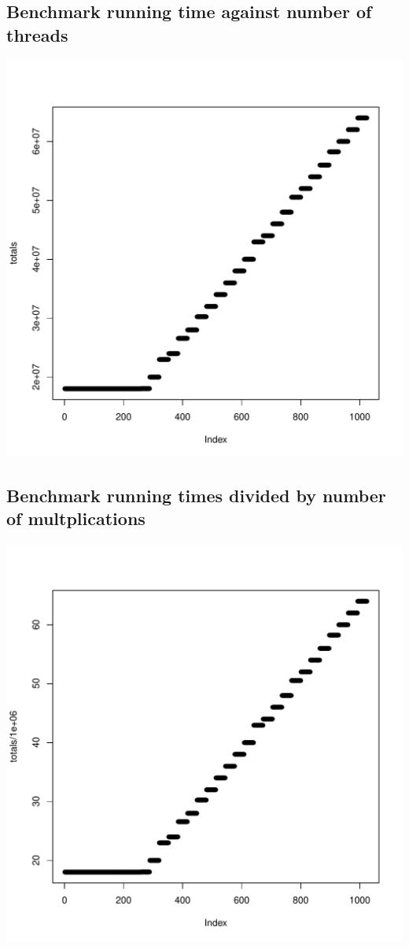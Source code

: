 \documentclass{article}
\begin{document}
	\subsection{Benchmark running time against number of threads}
	\includegraphics[width=\linewidth]{"graphics/running_times"}
	\pagebreak

	\subsection{Benchmark running times divided by number of multplications}
	\includegraphics[width=\linewidth]{"graphics/latency_estimate"}
	\pagebreak
\end{document}
